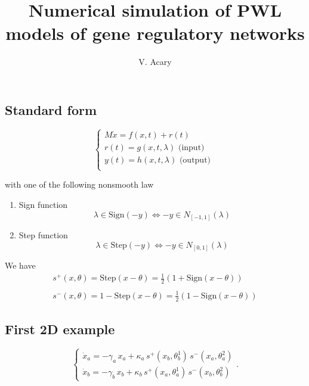 \documentclass{article}
\title{Numerical simulation of PWL models of gene regulatory networks}
\author{V. Acary}
\begin{document}
\maketitle
\subsection*{Standard form}

\begin{equation}
  \label{eq:std}
  \left\{\begin{array}{l}
      M \dot x  = f(x,t) +  r(t) \\
      r(t) = g(x,t,\lambda) \text{ (input) }  \\
      y(t) = h(x,t,\lambda) \text{ (output) } \\
   \end{array}\right.
\end{equation}

with one of the following nonsmooth law
\begin{enumerate}
\item Sign function
  \begin{equation}
    \label{eq:sign}
    \lambda \in \mbox{Sign} (-y) \Longleftrightarrow  - y  \in N_{[-1,1]}(\lambda)
  \end{equation}
\item Step function
  \begin{equation}
    \label{eq:step}
    \lambda \in \mbox{Step} (-y) \Longleftrightarrow  - y  \in N_{[0,1]}(\lambda)
  \end{equation}
\end{enumerate}

We have
\begin{equation}
  \label{eq:signstep}
  \begin{array}{l}
  s^+(x,\theta) = \mbox{Step}(x-\theta) = \frac 1 2 (1+ \mbox{Sign}(x-\theta))\\ \\
  s^-(x,\theta) = 1 - \mbox{Step}(x-\theta) = \frac 1 2 (1- \mbox{Sign}(x-\theta))
\end{array}
\end{equation}
\subsection*{First 2D example}
\begin{equation*}
\left\{\begin{array}{l} \dot{x}_{a} = - \gamma_{a}\, x_{a}+ \kappa_{a} \, s^{+}(x_{b},\theta_{b}^1)\, s^{-}(x_{a},\theta_{a}^2) \\
\dot{x}_{b} = - \gamma_{b}\, x_{b} + \kappa_{b} \,  s^{+}(x_{a},\theta_{a}^1)\,s^{-}(x_{b},\theta_{b}^2) \end{array}\right. .
\end{equation*}
\end{document}
